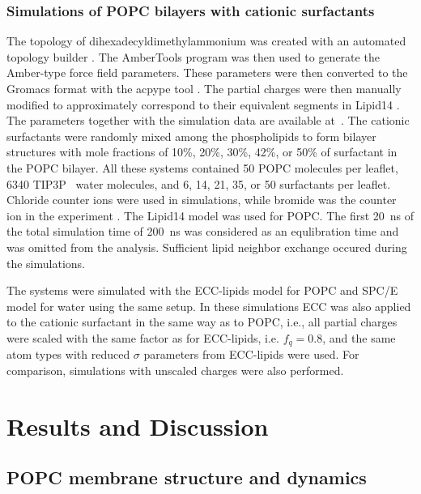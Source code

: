 \documentclass[aip,jcp,twocolumn]{revtex4}
\begin{document}
\subsubsection{Simulations of POPC bilayers with cationic surfactants}
The topology of dihexadecyldimethylammonium
was created with an automated topology builder \cite{malde11}. 
The AmberTools program \cite{amber} was then used to generate the Amber-type force field
parameters. These parameters were then converted to the Gromacs format with
the acpype tool \cite{acpype}. The partial charges were then manually modified
to approximately correspond to their equivalent segments in Lipid14 \cite{dickson14}.
The parameters together with the simulation data are available
at~\cite{POPClipid14T313K,POPClipid1410perCATsurfT313K,POPClipid1420perCATsurfT313K,POPClipid1430perCATsurfT313K,POPClipid1442perCATsurfT313K,POPClipid1450perCATsurfT313K}.
The cationic surfactants were randomly mixed among the phospholipids to form bilayer structures with
mole fractions of 10\%, 20\%, 30\%, 42\%, or 50\% of surfactant in the POPC bilayer.
All these systems contained 50 POPC molecules per leaflet, 6340 TIP3P~\cite{jorgensen83} water molecules, and
6, 14, 21, 35, or 50 surfactants per leaflet. 
Chloride counter ions were used in simulations, 
while bromide was the counter ion in the experiment \cite{scherer89}.
The Lipid14 model was used for POPC.
The first 20~ns of the total simulation time of 200~ns
was considered as an equlibration time and was omitted from the analysis.
Sufficient lipid neighbor exchange occured during the simulations.

The systems were simulated with the ECC-lipids model for POPC 
and SPC/E model for water using the same setup.
In these simulations ECC was also applied to the cationic surfactant 
in the same way as to POPC, i.e.,
all partial charges were scaled with the same factor as for ECC-lipids, i.e. $f_q=0.8$, 
and the same atom types with reduced $\sigma$ parameters from ECC-lipids were used. 
For comparison, simulations with unscaled charges were also performed.


\section{Results and Discussion}

\subsection{POPC membrane structure and dynamics}
\end{document}
